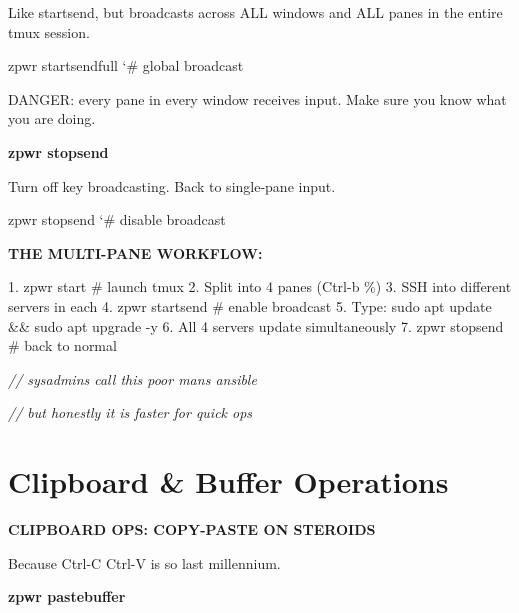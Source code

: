 \documentclass[11pt,a4paper,twoside]{book}
\begin{document}
Like startsend, but broadcasts across ALL windows and ALL panes in the entire tmux session.

\begin{codebox}
\color{neongreen}zpwr startsendfull          {\char`\#} global broadcast\\
\end{codebox}

DANGER: every pane in every window receives input. Make sure you know what you are doing.


\vspace{12pt}
{\bfseries\color{neonyellow} zpwr stopsend}\vspace{4pt}

Turn off key broadcasting. Back to single-pane input.

\begin{codebox}
\color{neongreen}zpwr stopsend               {\char`\#} disable broadcast\\
\end{codebox}


\vspace{12pt}
{\bfseries\color{neonyellow} THE MULTI-PANE WORKFLOW:}\vspace{4pt}

1. zpwr start                   \# launch tmux 2. Split into 4 panes (Ctrl-b \%) 3. SSH into different servers in each 4. zpwr startsend               \# enable broadcast 5. Type: sudo apt update \&\& sudo apt upgrade -y 6. All 4 servers update simultaneously 7. zpwr stopsend                \# back to normal

{\small\itshape\color{dimtext} // sysadmins call this poor mans ansible}

{\small\itshape\color{dimtext} // but honestly it is faster for quick ops}


\vspace{16pt}

\section{Clipboard \& Buffer Operations}


\vspace{10pt}
{\large\bfseries\color{neoncyan} CLIPBOARD OPS: COPY-PASTE ON STEROIDS}\vspace{6pt}

Because Ctrl-C Ctrl-V is so last millennium.


\vspace{12pt}
{\bfseries\color{neonyellow} zpwr pastebuffer}\vspace{4pt}
\end{document}
